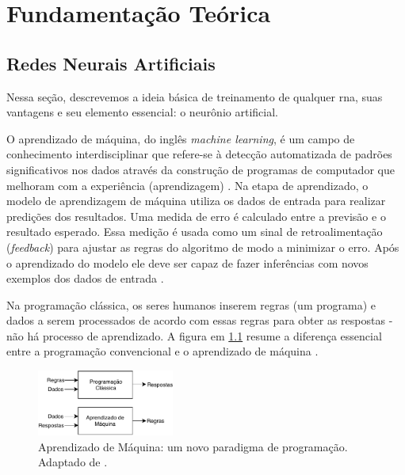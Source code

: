 \chapter{Fundamentação Teórica}


\section{Redes Neurais Artificiais}
Nessa seção, descrevemos a ideia básica de treinamento de qualquer \acrshort{rna}, suas vantagens e seu elemento essencial: o neurônio artificial. 


O aprendizado de máquina, do inglês \textit{machine learning}, é um campo de conhecimento interdisciplinar que refere-se à detecção automatizada de padrões significativos nos dados através da construção de programas de computador que melhoram com a experiência (aprendizagem) \cite{shalev2014understanding}. 
Na etapa de aprendizado, o modelo de aprendizagem de máquina  utiliza os dados de entrada para realizar predições dos resultados. Uma medida de erro é calculado entre a previsão e o resultado esperado. Essa medição é usada como um sinal de retroalimentação (\textit{feedback}) para ajustar as regras  do algoritmo de modo a minimizar o erro. Após o aprendizado do modelo ele deve ser capaz de fazer inferências com novos exemplos dos dados de entrada \cite{FrancoisDeepLearning}.

Na programação clássica, os seres humanos inserem regras (um programa) e dados a serem processados de acordo com essas regras para obter as respostas  -  não há processo de aprendizado. A figura em \ref{fig:machinelearning} resume a diferença essencial entre a programação convencional e o aprendizado de máquina \cite{FrancoisDeepLearning}.  


\begin{figure}[h]
	\centering
	\includegraphics[width=0.4\textwidth]{figuras/MachineLearning.pdf}
	\caption[Paradigmas de programação]{Aprendizado de Máquina: um novo paradigma de programação. Adaptado de \cite{FrancoisDeepLearning}.}
	\label{fig:machinelearning}
\end{figure}



